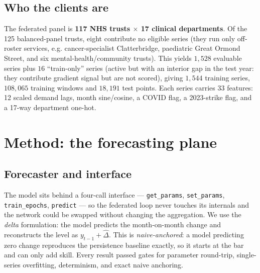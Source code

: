 \documentclass[11pt,a4paper]{article}
\begin{document}
\subsection{Who the clients are}
The federated panel is \textbf{117 NHS trusts $\times$ 17 clinical departments}. Of the 125
balanced-panel trusts, eight contribute no eligible series (they run only off-roster services, e.g.
cancer-specialist Clatterbridge, paediatric Great Ormond Street, and six mental-health/community
trusts). This yields $1{,}528$ evaluable series plus $16$ ``train-only'' series (active but with an
interior gap in the test year: they contribute gradient signal but are not scored), giving
$1{,}544$ training series, $108{,}065$ training windows and $18{,}191$ test points. Each series carries
$33$ features: 12 scaled demand lags, month sine/cosine, a COVID flag, a 2023-strike flag, and a
17-way department one-hot.

\section{Method: the forecasting plane}\label{sec:method}
\subsection{Forecaster and interface}
The model sits behind a four-call interface --- \texttt{get\_params}, \texttt{set\_params},
\texttt{train\_epochs}, \texttt{predict} --- so the federated loop never touches its internals and the
network could be swapped without changing the aggregation. We use the \emph{delta} formulation:
the model predicts the month-on-month change and reconstructs the level as
$y_{t-1} + \widehat{\Delta}$. This is \emph{naive-anchored}: a model predicting zero change reproduces
the persistence baseline exactly, so it starts at the bar and can only add skill. Every result passed
gates for parameter round-trip, single-series overfitting, determinism, and exact naive anchoring.
\end{document}
